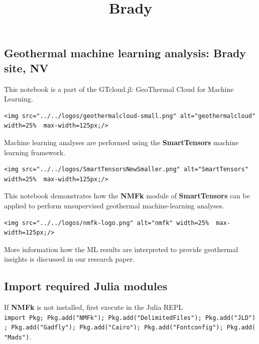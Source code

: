 \documentclass[11pt]{article}
\title{Brady}
\begin{document}
    
    \maketitle
    
    

    
    \hypertarget{geothermal-machine-learning-analysis-brady-site-nv}{%
\subsection{Geothermal machine learning analysis: Brady site,
NV}\label{geothermal-machine-learning-analysis-brady-site-nv}}

This notebook is a part of the GTcloud.jl: GeoThermal Cloud for Machine
Learning.

\begin{verbatim}
<img src="../../logos/geothermalcloud-small.png" alt="geothermalcloud" width=25%  max-width=125px;/>
\end{verbatim}

Machine learning analyses are performed using the \textbf{SmartTensors}
machine learning framework.

\begin{verbatim}
<img src="../../logos/SmartTensorsNewSmaller.png" alt="SmartTensors" width=25%  max-width=125px;/>
\end{verbatim}

This notebook demonstrates how the \textbf{NMFk} module of
\textbf{SmartTensors} can be applied to perform unsupervised geothermal
machine-learning analyses.

\begin{verbatim}
<img src="../../logos/nmfk-logo.png" alt="nmfk" width=25%  max-width=125px;/>
\end{verbatim}

More information how the ML results are interpreted to provide
geothermal insights is discussed in our research paper.

    \hypertarget{import-required-julia-modules}{%
\subsection{Import required Julia
modules}\label{import-required-julia-modules}}

If \textbf{NMFk} is not installed, first execute in the Julia REPL
\texttt{import\ Pkg;\ Pkg.add("NMFk");\ Pkg.add("DelimitedFiles");\ Pkg.add("JLD");\ Pkg.add("Gadfly");\ Pkg.add("Cairo");\ Pkg.add("Fontconfig");\ Pkg.add("Mads")}.
\end{document}
